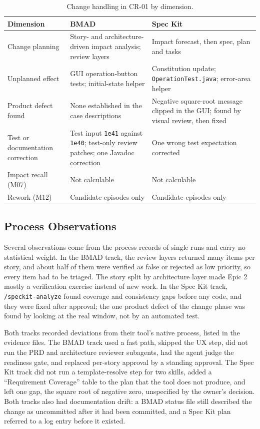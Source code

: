 \documentclass[conference]{IEEEtran}
\begin{document}
\begin{table}[htbp]
\caption{Change handling in CR-01 by dimension.}\label{tbl-change}
\centering\footnotesize
\begin{tabular}{p{} p{} p{}}
\hline
\textbf{Dimension} & \textbf{BMAD} & \textbf{Spec Kit} \\
\hline
Change planning & Story- and architecture-driven impact analysis; review layers & Impact forecast, then spec, plan and tasks \\
Unplanned effect & GUI operation-button tests; initial-state helper & Constitution update; \texttt{OperationTest.java}; error-area helper \\
Product defect found & None established in the case descriptions & Negative square-root message clipped in the GUI; found by visual review, then fixed \\
Test or documentation correction & Test input \texttt{1e41} against \texttt{1e40}; test-only review patches; one Javadoc correction & One wrong test expectation corrected \\
Impact recall (M07) & Not calculable & Not calculable \\
Rework (M12) & Candidate episodes only & Candidate episodes only \\
\hline
\end{tabular}
\end{table}

\subsection{Process Observations}\label{process-observations}

Several observations come from the process records of single runs and
carry no statistical weight. In the BMAD track, the review layers
returned many items per story, and about half of them were verified as
false or rejected as low priority, so every item had to be triaged. The
story split by architecture layer made Epic 2 mostly a verification
exercise instead of new work. In the Spec Kit track,
\texttt{/speckit-analyze} found coverage and consistency gaps before any
code, and they were fixed after approval; the one product defect of the
change phase was found by looking at the real window, not by an
automated test.

Both tracks recorded deviations from their tool's native process, listed
in the evidence files. The BMAD track used a fast path, skipped the UX
step, did not run the PRD and architecture reviewer subagents, had the
agent judge the readiness gate, and replaced per-story approval by a
standing approval. The Spec Kit track did not run a template-resolve
step for two skills, added a ``Requirement Coverage'' table to the plan
that the tool does not produce, and left one gap, the square root of
negative zero, unspecified by the owner's decision. Both tracks also had
documentation drift: a BMAD status file still described the change as
uncommitted after it had been committed, and a Spec Kit plan referred to
a log entry before it existed.
\end{document}
